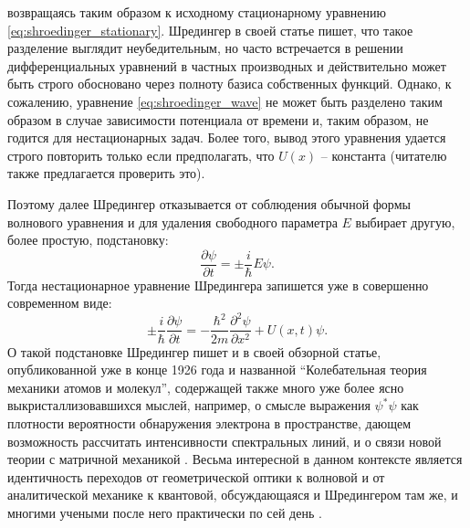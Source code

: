 \documentclass[14pt, a4paper]{extreport}
\numberwithin{equation}{section}
\begin{document}
возвращаясь таким образом к исходному стационарному уравнению \eqref{eq:shroedinger_stationary}.  Шредингер в своей статье пишет, что такое разделение выглядит неубедительным, но часто встречается в решении дифференциальных уравнений в частных производных и действительно может быть строго обосновано через полноту базиса собственных функций. Однако, к сожалению, уравнение \eqref{eq:shroedinger_wave} не может быть разделено таким образом в случае зависимости потенциала от времени и, таким образом, не годится для нестационарных задач. Более того, вывод этого уравнения удается строго повторить только если предполагать, что $U(x)$ -- константа (читателю также предлагается проверить это).

Поэтому далее Шредингер отказывается от соблюдения обычной формы волнового уравнения и для удаления свободного параметра $E$ выбирает другую, более простую, подстановку:
\begin{equation}
	\frac{\partial \psi}{\partial t} = \pm \frac{i}{\hbar} E \psi.
\end{equation}
Тогда нестационарное уравнение Шредингера запишется уже в совершенно современном виде:
\begin{equation}
\pm \frac{i}{\hbar}\frac{\partial \psi}{\partial t}  = -\frac{\hbar^2}{2m} \frac{\partial^2 \psi}{\partial x^2} + U(x,t)\psi.
\end{equation}
О такой подстановке Шредингер пишет и в своей обзорной статье, опубликованной уже в конце 1926 года и названной ``Колебательная теория механики атомов и молекул'', содержащей также много уже более ясно выкристаллизовавшихся мыслей, например, о смысле выражения $\psi^*\psi$ как плотности вероятности обнаружения электрона в пространстве, дающем возможность рассчитать интенсивности спектральных линий, и о связи новой теории с матричной механикой \cite{schrodinger1926undulatory}. Весьма интересной в данном контексте является идентичность переходов от геометрической оптики к волновой и от аналитической механике к квантовой, обсуждающаяся и Шредингером там же, и многими учеными после него практически по сей день \cite{masoliver2009classical}.
\end{document}

